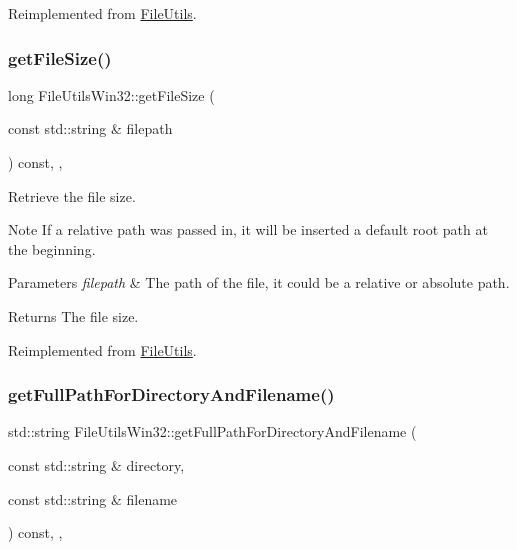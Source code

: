 Reimplemented from \hyperlink{classFileUtils_a1804c928fb8897e07e181a8e72362e0a}{File\+Utils}.

\mbox{\label{classFileUtilsWin32_a49d0c49a6f1c8a9376d678596c17f502}} 
\subsubsection{\texorpdfstring{get\+File\+Size()}{getFileSize()}\hspace{0.1cm}{\footnotesize\ttfamily [3/3]}}
{\footnotesize\ttfamily long File\+Utils\+Win32\+::get\+File\+Size (\begin{DoxyParamCaption}\item[{const std\+::string \&}]{filepath }\end{DoxyParamCaption}) const\hspace{0.3cm}{\ttfamily [override]}, {\ttfamily [protected]}, {\ttfamily [virtual]}}

Retrieve the file size.

\begin{DoxyNote}{Note}
If a relative path was passed in, it will be inserted a default root path at the beginning. 
\end{DoxyNote}

\begin{DoxyParams}{Parameters}
{\em filepath} & The path of the file, it could be a relative or absolute path. \\
\hline
\end{DoxyParams}
\begin{DoxyReturn}{Returns}
The file size. 
\end{DoxyReturn}


Reimplemented from \hyperlink{classFileUtils_acba4a8730094e74096bfe4cede7f0315}{File\+Utils}.

\mbox{\label{classFileUtilsWin32_a32e9d4ce94fa867563c2649bbb6a8416}} 
\subsubsection{\texorpdfstring{get\+Full\+Path\+For\+Directory\+And\+Filename()}{getFullPathForDirectoryAndFilename()}}
{\footnotesize\ttfamily std\+::string File\+Utils\+Win32\+::get\+Full\+Path\+For\+Directory\+And\+Filename (\begin{DoxyParamCaption}\item[{const std\+::string \&}]{directory,  }\item[{const std\+::string \&}]{filename }\end{DoxyParamCaption}) const\hspace{0.3cm}{\ttfamily [override]}, {\ttfamily [protected]}, {\ttfamily [virtual]}}

